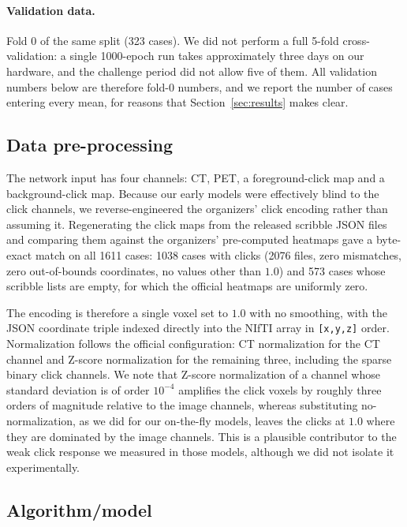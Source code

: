 \documentclass[runningheads]{llncs}
\begin{document}
\paragraph{Validation data.}
Fold 0 of the same split (323 cases). We did not perform a full 5-fold
cross-validation: a single 1000-epoch run takes approximately three days on our
hardware, and the challenge period did not allow five of them. All validation
numbers below are therefore fold-0 numbers, and we report the number of cases
entering every mean, for reasons that Section~\ref{sec:results} makes clear.

\subsection{Data pre-processing}

The network input has four channels: CT, PET, a foreground-click map and a
background-click map. Because our early models were effectively blind to the
click channels, we reverse-engineered the organizers' click encoding rather
than assuming it. Regenerating the click maps from the released scribble JSON
files and comparing them against the organizers' pre-computed heatmaps gave a
byte-exact match on all 1611 cases: 1038 cases with clicks (2076 files, zero
mismatches, zero out-of-bounds coordinates, no values other than $1.0$) and 573
cases whose scribble lists are empty, for which the official heatmaps are
uniformly zero.

The encoding is therefore a single voxel set to $1.0$ with no smoothing, with
the JSON coordinate triple indexed directly into the NIfTI array in
\texttt{[x,y,z]} order. Normalization follows the official configuration:
CT normalization for the CT channel and Z-score normalization for the remaining
three, including the sparse binary click channels. We note that Z-score
normalization of a channel whose standard deviation is of order $10^{-4}$
amplifies the click voxels by roughly three orders of magnitude relative to the
image channels, whereas substituting no-normalization, as we did for our
on-the-fly models, leaves the clicks at $1.0$ where they are dominated by the
image channels. This is a plausible contributor to the weak click response we
measured in those models, although we did not isolate it experimentally.

\subsection{Algorithm/model}
\end{document}
